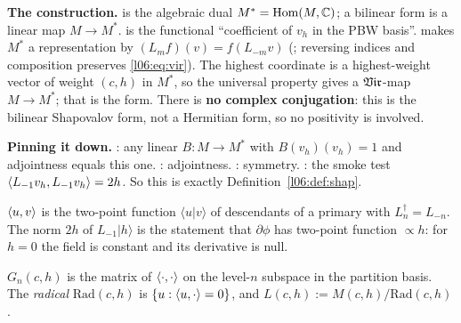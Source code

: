 \begin{dictionary}
\textbf{The construction.}  is the algebraic dual $M^* = \mathrm{Hom}(M,{\mathbb{C}})$; a
bilinear form is a linear map $M\to M^*$.  is the functional ``coefficient of
$v_h$ in the PBW basis''.  makes $M^*$ a representation by $(L_m f)(v) = f(L_{-m}v)$
(; reversing indices and composition preserves \eqref{l06:eq:vir}). The highest
coordinate is a highest-weight vector of weight $(c,h)$ in $M^*$, so the universal property gives a
$\mathfrak{Vir}$-map $M\to M^*$; that is the form. There is \textbf{no complex conjugation}: this is the
bilinear Shapovalov form, not a Hermitian form, so no positivity is involved.

\textbf{Pinning it down.} \allowbreak{}: any linear $B:M\to M^*$ with
$B(v_h)(v_h) = 1$ and adjointness equals this one. : adjointness.
\allowbreak{}: symmetry. \allowbreak{}\allowbreak{}: the smoke test
$\langle L_{-1}v_h,L_{-1}v_h\rangle = 2h$. So this is exactly Definition~\ref{l06:def:shap}.
\end{dictionary}

\begin{physics}
$\langle u,v\rangle$ is the two-point function $\langle u|v\rangle$ of descendants of a primary with
$L_n^\dagger = L_{-n}$. The norm $2h$ of $L_{-1}|h\rangle$ is the statement that $\partial\phi$ has two-point
function $\propto h$: for $h = 0$ the field is constant and its derivative is null.
\end{physics}

\begin{definition}\label{l06:def:gramverma}
$G_n(c,h)$ is the matrix of $\langle \cdot,\cdot\rangle$ on the level-$n$ subspace in the partition basis. The
\emph{radical} $\mathrm{Rad}(c,h)$ is $\{u : \langle u,\cdot\rangle = 0\}$, and $L(c,h) := M(c,h)/\mathrm{Rad}(c,h)$.
\end{definition}

